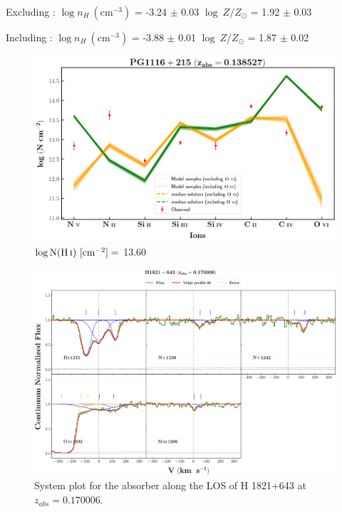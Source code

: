   Excluding  : $\log n_H \ (\text{cm}^{-3})$ = -3.24 $\pm$ 0.03 \hspace{10mm} $\log \ Z/Z_\odot$ = 1.92 $\pm$ 0.03
  
  Including  : $\log n_H \ (\text{cm}^{-3})$ = -3.88 $\pm$ 0.01 \hspace{10mm} $\log \ Z/Z_\odot$ = 1.87 $\pm$ 0.02 \\
  
  
  \newpage 
  
  \begin{figure}[!h]
      \centering
      \includegraphics[width=0.9\linewidth]{Ionisation-Modelling-Plots/pg1116-z=0.138527-compII_logZ=-1.png}
      \caption{$\log \text{N}(\ion{H}{i}) \ [\text{cm}^{-2}]=$ 13.60}
  \end{figure}
  
  
  
  \newpage
  
  \begin{landscape}
  
  \begin{figure}
      \centering
      \vspace{-20mm}
      \hspace*{-35mm}
      \includegraphics[width=1.25\linewidth]{System-Plots/H1821+643_z=0.170006_sys_plot.png}
      \caption{System plot for the absorber along the LOS of H 1821+643 at $z_{abs} = 0.170006$. }
  \end{figure}
  
  \end{landscape}
  
